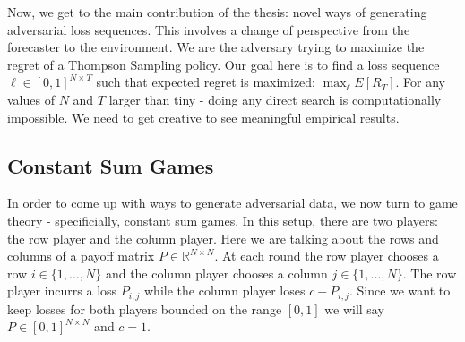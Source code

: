 \documentclass[10pt,a4paper]{article} %
\begin{document}
	Now, we get to the main contribution of the thesis: novel ways of generating adversarial loss sequences.  This involves a change of perspective from the forecaster to the environment.  We are the adversary trying to maximize the regret of a Thompson Sampling policy.  Our goal here is to find a loss sequence $\ell \in \left[ 0, 1 \right] ^{N \times T}$ such that expected regret is maximized:  $\max_\ell E[R_T]$.  For any values of $N$ and $T$ larger than tiny - doing any direct search is computationally impossible.  We need to get creative to see meaningful empirical results.
		
	\subsection{Constant Sum Games}
	
	In order to come up with ways to generate adversarial data, we now turn to game theory - specificially, constant sum games.  In this setup, there are two players: the row player and the column player.  Here we are talking about the rows and columns of a payoff matrix $P \in \mathds{R}^{N \times N}$.  At each round the row player chooses a row $i \in \{1, ..., N\}$ and the column player chooses a column $j \in \{1, ..., N\}$.  The row player incurrs a loss $P_{i, j}$ while the column player loses $c - P_{i, j}$.  Since we want to keep losses for both players bounded on the range $\left[ 0, 1 \right] $ we will say $P \in \left[ 0, 1 \right] ^{N \times N}$ and $c = 1$.
		
\end{document}
